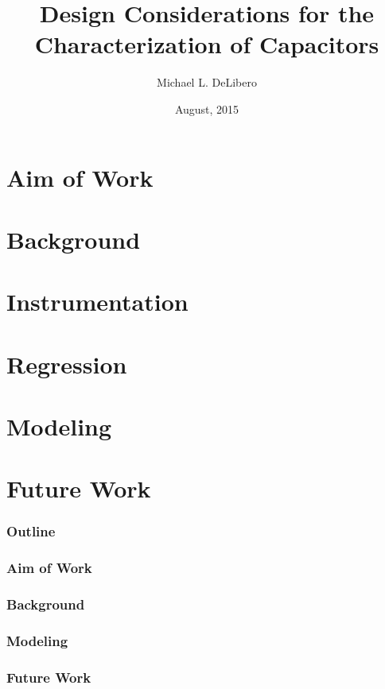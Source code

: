 \documentclass{beamer}
\title{Design Considerations for the Characterization of Capacitors}
\author{Michael L. DeLibero}
\date{August, 2015}
\institute[CWRU]{Case Western Reserve University}
\begin{document}
\section{Aim of Work}
\section{Background}
\section{Instrumentation}
\section{Regression}
\section{Modeling}
\section{Future Work}

\begin{frame}
    \titlepage
\end{frame}

\begin{frame}
  \frametitle{Outline}
  \tableofcontents
\end{frame}

\begin{frame}
    \frametitle{Aim of Work}
\end{frame}

\begin{frame}
    \frametitle{Background}
\end{frame}





\begin{frame}
    \frametitle{Modeling}
\end{frame}

\begin{frame}
    \frametitle{Future Work}
\end{frame}


\end{document}
